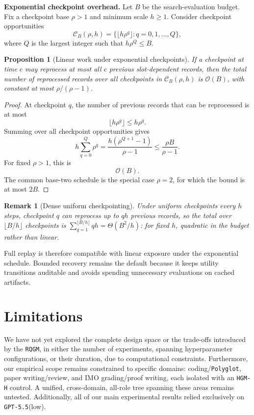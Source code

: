 \documentclass{paper}
\newtheorem{proposition}{Proposition}
\newtheorem{remark}{Remark}
\newcommand{\ourmethod}{\texttt{RQGM}\xspace}
\newcommand{\theourmethod}{the \ourmethod}
\newcommand{\hgmh}{\texttt{HGM-H}\xspace}
\newcommand{\gptlow}{\texttt{GPT-5.5}\xspace}
\newcommand{\polyglot}{\texttt{Polyglot}\xspace}
\begin{document}
\noindent\textbf{Exponential checkpoint overhead.}
Let \(B\) be the search-evaluation budget. Fix a checkpoint base \(\rho>1\) and minimum scale \(h\ge1\). Consider checkpoint opportunities
\[
\mathcal C_B(\rho,h)
=
\{\lfloor h\rho^q\rfloor : q=0,1,\ldots,Q\},
\]
where \(Q\) is the largest integer such that \(h\rho^Q\le B\).

\begin{proposition}[Linear work under exponential checkpoints]
\label{prop:linear-work}
If a checkpoint at time \(c\) may reprocess at most all \(c\) previous slot-dependent records, then the total number of reprocessed records over all checkpoints in \(\mathcal C_B(\rho,h)\) is \(\mathcal{O}(B)\), with constant at most \(\rho/(\rho-1)\).
\end{proposition}

\begin{proof}
At checkpoint \(q\), the number of previous records that can be reprocessed is at most
\[
\lfloor h\rho^q\rfloor
\le
h\rho^q.
\]
Summing over all checkpoint opportunities gives
\[
h\sum_{q=0}^{Q}\rho^q
=
\frac{h(\rho^{Q+1}-1)}{\rho-1}
\le
\frac{\rho B}{\rho-1}.
\]
For fixed \(\rho>1\), this is
\[
\mathcal{O}(B).
\]
The common base-two schedule is the special case \(\rho=2\), for which the bound is at most \(2B\).
\end{proof}

\begin{remark}[Dense uniform checkpointing]
\label{rem:dense-quadratic}
Under uniform checkpoints every \(h\) steps, checkpoint \(q\) can reprocess up to \(qh\) previous records, so the total over \(\lfloor B/h\rfloor\) checkpoints is \(\sum_{q=1}^{\lfloor B/h\rfloor} qh = \Theta(B^2/h)\): for fixed \(h\), quadratic in the budget rather than linear.
\end{remark}

Full replay is therefore compatible with linear exposure under the exponential schedule. Bounded recovery remains the default because it keeps utility transitions auditable and avoids spending unnecessary evaluations on cached artifacts.


\section{Limitations}
\label{app:limitations}

We have not yet explored the complete design space or the trade-offs introduced by \theourmethod, in either the number of experiments, spanning hyperparameter configurations, or their duration, due to computational constraints. Furthermore, our empirical scope remains constrained to specific domains: coding/\polyglot, paper writing/review, and IMO grading/proof writing, each isolated with an \hgmh control. A unified, cross-domain, all-role tree spanning these areas remains untested. Additionally, all of our main experimental results relied exclusively on \gptlow (low).
\end{document}
